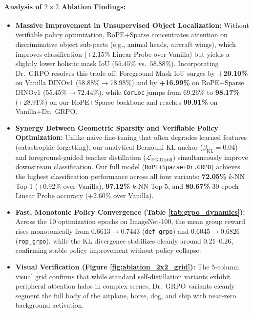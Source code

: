 \documentclass[11pt,a4paper]{article}
\begin{document}
\paragraph{Analysis of $2\times 2$ Ablation Findings:}
\begin{itemize}[leftmargin=*]
    \item \textbf{Massive Improvement in Unsupervised Object Localization:} Without verifiable policy optimization, RoPE+Sparse concentrates attention on discriminative object sub-parts (e.g., animal heads, aircraft wings), which improves classification (+2.15\% Linear Probe over Vanilla) but yields a slightly lower holistic mask IoU ($55.45\%$ vs.\ $58.88\%$). Incorporating Dr.\ GRPO resolves this trade-off: Foreground Mask IoU surges by \textbf{+20.10\%} on Vanilla DINOv1 ($58.88\% \to 78.98\%$) and by \textbf{+16.99\%} on RoPE+Sparse DINOv1 ($55.45\% \to 72.44\%$), while \texttt{CorLoc} jumps from $69.26\%$ to \textbf{98.17\%} (+28.91\%) on our RoPE+Sparse backbone and reaches \textbf{99.91\%} on Vanilla+Dr.\ GRPO.
    \item \textbf{Synergy Between Geometric Sparsity and Verifiable Policy Optimization:} Unlike naive fine-tuning that often degrades learned features (catastrophic forgetting), our analytical Bernoulli KL anchor ($\beta_{\text{KL}}=0.04$) and foreground-guided teacher distillation ($\mathcal{L}_{\text{FG-Distill}}$) simultaneously improve downstream classification. Our full model (\texttt{RoPE+Sparse+Dr.GRPO}) achieves the highest classification performance across all four variants: \textbf{72.05\%} $k$-NN Top-1 (+0.92\% over Vanilla), \textbf{97.12\%} $k$-NN Top-5, and \textbf{80.67\%} 30-epoch Linear Probe accuracy (+2.60\% over Vanilla).
    \item \textbf{Fast, Monotonic Policy Convergence (Table \ref{tab:grpo_dynamics}):} Across the 10 optimization epochs on ImageNet-100, the mean group reward rises monotonically from $0.6613 \to 0.7443$ (\texttt{def\_grpo}) and $0.6045 \to 0.6826$ (\texttt{rop\_grpo}), while the KL divergence stabilizes cleanly around $0.21\text{--}0.26$, confirming stable policy improvement without policy collapse.
    \item \textbf{Visual Verification (Figure \ref{fig:ablation_2x2_grid}):} The 5-column visual grid confirms that while standard self-distillation variants exhibit peripheral attention halos in complex scenes, Dr.\ GRPO variants cleanly segment the full body of the airplane, horse, dog, and ship with near-zero background activation.
\end{itemize}
\end{document}
